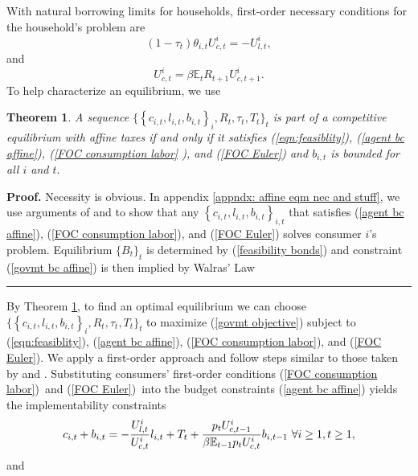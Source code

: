 \documentclass[thmsb,11pt]{article}
\newtheorem{theorem}{Theorem}
\newenvironment{proof}[1][Proof]{\noindent \textbf{#1.} }{\  \rule{0.5em}{0.5em}}
\begin{document}
With natural borrowing limits for households, first-order necessary conditions for the  household's problem
 are%
\begin{equation}
\left( 1-\tau _{t}\right) \theta _{i,t}U_{c,t}^{i}=-U_{l,t}^{i},
\label{FOC consumption labor}
\end{equation}%
and%
\begin{equation}
U_{c,t}^{i}=\beta\mathbb{E}_{t}R_{t+1}U_{c,t+1}^{i}.  \label{FOC Euler}
\end{equation}%
To help characterize an equilibrium, we use

\begin{theorem}
\label{prop: affine eqm nec and suff}A sequence $\{ \left \{
c_{i,t},l_{i,t},b_{i,t}\right \} _{i},R_{t},\tau _{t},T_{t}\}_t$ is part of
a competitive equilibrium with affine taxes if and only if it satisfies (\ref{eqn:feasiblity}), (\ref{agent bc affine}), (\ref{FOC consumption labor}%
), and (\ref{FOC Euler}) and $b_{i,t}$ is bounded for all $i$ and $t.$
\end{theorem}
\begin{proof}
Necessity is obvious. In  appendix   \ref{appndx: affine eqm nec and stuff}, we use arguments of \cite{Magill1994} and \cite{Constantinides1996} to show that any $\left \{
c_{i,t},l_{i,t},b_{i,t}\right \} _{i,t}$ that satisfies (\ref{agent bc
affine}), (\ref{FOC consumption labor}), and (\ref{FOC Euler}) solves consumer $i$'s  problem. Equilibrium $\{B_{t}\}_t$ is determined by
(\ref{feasibility bonds}) and constraint (\ref{govmt bc affine}) is then
implied by Walras' Law
\end{proof}

By Theorem  \ref{prop: affine eqm nec and suff}, to find an optimal equilibrium
we can choose $\{ \left \{ c_{i,t},l_{i,t},b_{i,t}\right \} _{i},R_{t},\tau
_{t},T_{t}\}_{t}$ to maximize (\ref{govmt objective}) subject to (\ref{eqn:feasiblity}), (\ref{agent bc affine}), (\ref{FOC consumption labor}), and (\ref{FOC Euler}).
We  apply a first-order approach and follow steps similar to those taken by \cite{LucasJr.1983} and \citet{Aiyagari2002}.
 Substituting consumers' first-order
conditions (\ref{FOC consumption labor})\ and (\ref{FOC Euler})\ into the
budget constraints (\ref{agent bc affine}) yields the implementability constraints %
\begin{equation}
c_{i,t}+b_{i,t}=-\frac{U_{l,t}^{i}}{U_{c,t}^{i}}l_{i,t}+T_{t}+\frac{%
p_tU_{c,t-1}^{i}}{\beta \mathbb{E}_{t-1}p_tU_{c,t}^{i}}b_{i,t-1}\ \forall i \geq 1 ,t \geq 1,  \label{affine implementability a}
\end{equation}
and %
\end{document}
